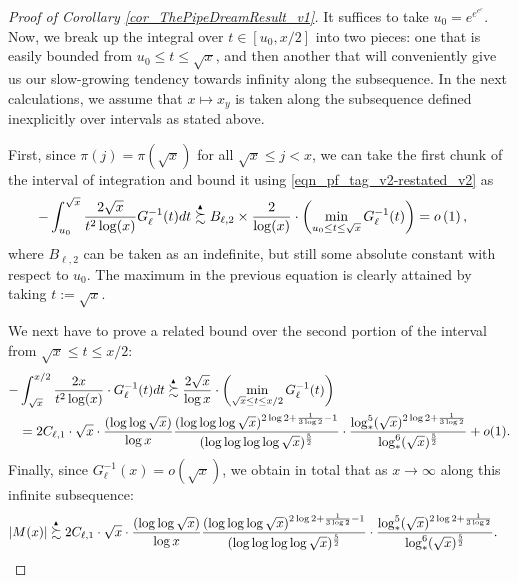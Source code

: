 \documentclass[11pt,reqno,a4letter]{article}
\numberwithin{figure}{section}
\numberwithin{table}{section}
\theoremstyle{plain}
\numberwithin{theorem}{section}
\theoremstyle{definition}
\newcommand{\SuccSim}[0]{\overset{_{\scriptsize{\blacktriangle}}}{\succsim}}
\begin{document}
\begin{proof}[Proof of Corollary \ref{cor_ThePipeDreamResult_v1}] 
\label{proofOf_cor_ThePipeDreamResult_v1} 
It suffices to take $u_0 = e^{e^{e^{e}}}$. 
Now, we break up the integral over $t \in [u_0, x/2]$ into two pieces: one that is easily bounded 
from $u_0 \leq t \leq \sqrt{x}$, 
and then another that will conveniently give us our slow-growing tendency towards 
infinity along the subsequence. 
In the next calculations, we assume that $x \mapsto x_y$ is taken along the 
subsequence defined inexplicitly over intervals as stated above.

First, since $\pi(j) = \pi(\sqrt{x})$ for all $\sqrt{x} \leq j < x$, we can take the first chunk 
of the interval of integration and bound it using \eqref{eqn_pf_tag_v2-restated_v2} as 
\begin{align*} 
-\int_{u_0}^{\sqrt{x}} \frac{2\sqrt{x}}{t^2 \log(x)} G_{\ell}^{-1}(t) dt & \SuccSim 
     B_{\ell,2} \times \frac{2}{\log(x)} \cdot \left(\min\limits_{u_0 \leq t \leq \sqrt{x}} 
     G_{\ell}^{-1}(t)\right) = o\left(1\right), 
\end{align*} 
where $B_{\ell,2}$ can be taken as an indefinite, but still some absolute constant with respect to $u_0$. 
The maximum in the previous equation is clearly attained by taking $t := \sqrt{x}$. 

We next have to prove a related bound over the second portion of the interval from 
$\sqrt{x} \leq t \leq x/2$: 
\begin{align*} 
- & \int_{\sqrt{x}}^{x/2} \frac{2 x}{t^2 \log(x)} \cdot G_{\ell}^{-1}(t) dt \SuccSim 
     \frac{2\sqrt{x}}{\log x} \cdot \left(\min_{\sqrt{x} \leq t \leq x/2} G_{\ell}^{-1}(t)\right) \\ 
     & = 2C_{\ell,1} \cdot \sqrt{x} \cdot 
     \frac{(\log\log \sqrt{x})}{\log x} \frac{(\log\log\log \sqrt{x})^{2\log 2+\frac{1}{3\log 2} - 1}}{ 
     (\log\log\log\log \sqrt{x})^{\frac{5}{2}}} \cdot \frac{\log_{\ast}^5(\sqrt{x})^{2\log 2 + \frac{1}{3\log 2}}}{ 
     \log_{\ast}^{6}(\sqrt{x})^{\frac{5}{2}}} + o(1). 
\end{align*} 
Finally, since $G_{\ell}^{-1}(x) = o(\sqrt{x})$, we obtain in total that as 
$x \rightarrow \infty$ along this infinite subsequence: 
\begin{align*} 
|M(x)| & \SuccSim 
     2C_{\ell,1} \cdot \sqrt{x} \cdot 
     \frac{(\log\log \sqrt{x})}{\log x} \frac{(\log\log\log \sqrt{x})^{2\log 2+\frac{1}{3\log 2} - 1}}{ 
     (\log\log\log\log \sqrt{x})^{\frac{5}{2}}} \cdot \frac{\log_{\ast}^5(\sqrt{x})^{2\log 2 + \frac{1}{3\log 2}}}{ 
     \log_{\ast}^{6}(\sqrt{x})^{\frac{5}{2}}}. 
     \qedhere 
\end{align*} 
\end{proof} 
\end{document}
